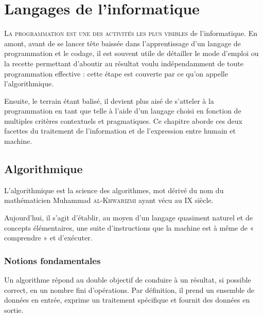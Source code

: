 \chapter[Langages de l'informatique]{Langages de l'informatique}%
\label{chap:VI}

\lettrine{L}{a programmation est une des activités les plus visibles} de l'informatique. En amont, avant de se lancer tête baissée dans l'apprentissage d'un langage de programmation et le codage, il est souvent utile de détailler le mode d'emploi ou la recette permettant d'aboutir au résultat voulu indépendamment de toute programmation effective : cette étape est couverte par ce qu'on appelle l'algorithmique.

Ensuite, le terrain étant balisé, il devient plus aisé de s'atteler à la programmation en tant que telle à l'aide d'un langage choisi en fonction de multiples critères contextuels et pragmatiques. Ce chapitre aborde ces deux facettes du traitement de l'information et de l'expression entre humain et machine.
\parnotes

\vspace{1.5\baselineskip}

\section[Algorithmique]{Algorithmique}
\label{sec:VI.1}

L'algorithmique est la science des algorithmes, mot dérivé du nom du mathématicien Muhammad \textsc{al-Khwarizmi} ayant vécu au IX siècle.

Aujourd'hui, il s'agit d'établir, au moyen d'un langage quasiment naturel et de concepts élémentaires, une suite d'instructions que la machine est à même de « comprendre » et d'exécuter.

\subsection[Notions fondamentales]{Notions fondamentales}
\label{sub:VI.1.1}

Un algorithme répond au double objectif de conduire à un résultat, si possible correct, en un nombre fini d'opérations. Par définition, il prend un ensemble de données en entrée, exprime un traitement spécifique et fournit des données en sortie.

